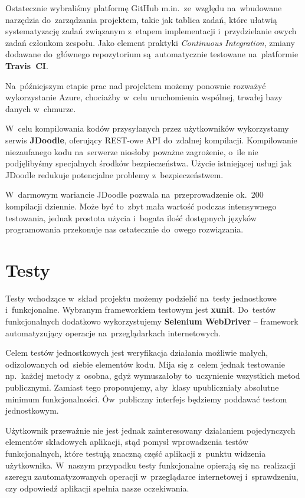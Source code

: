 \documentclass{article}
\begin{document}
Ostatecznie wybraliśmy platformę GitHub m.in.~ze~względu na~wbudowane narzędzia do~zarządzania projektem, takie jak tablica zadań, które ułatwią systematyzację zadań związanym z~etapem implementacji i~przydzielanie owych zadań członkom zespołu. Jako element praktyki \emph{Continuous Integration}, zmiany dodawane do~głównego repozytorium są~automatycznie testowane na~platformie \textbf{Travis~CI}.

Na~późniejszym etapie prac nad projektem możemy ponownie rozważyć wykorzystanie Azure, chociażby w~celu uruchomienia wspólnej, trwałej bazy danych w~chmurze.

W~celu kompilowania kodów przysyłanych przez użytkowników wykorzystamy serwis \textbf{JDoodle}, oferujący REST-owe API do~zdalnej kompilacji. Kompilowanie niezaufanego kodu na~serwerze niosłoby poważne zagrożenie, o~ile nie podjęlibyśmy specjalnych środków bezpieczeństwa. Użycie istniejącej usługi jak JDoodle redukuje potencjalne problemy z~bezpieczeństwem.

W~darmowym wariancie JDoodle pozwala na~przeprowadzenie ok.~200 kompilacji dziennie. Może być to~zbyt mała wartość podczas intensywnego testowania, jednak prostota użycia i~bogata ilość dostępnych języków programowania przekonuje nas ostatecznie do~owego rozwiązania.

\section{Testy}

Testy wchodzące w~skład projektu możemy podzielić na~testy jednostkowe i~funkcjonalne. Wybranym frameworkiem testowym jest \textbf{xunit}. Do~testów funkcjonalnych dodatkowo wykorzystujemy \textbf{Selenium WebDriver} -- framework automatyzujący operacje na~przeglądarkach internetowych.

Celem testów jednostkowych jest weryfikacja działania możliwie małych, odizolowanych od~siebie elementów kodu. Mija się z~celem jednak testowanie np.~każdej metody z~osobna, gdyż wymuszałoby to~uczynienie wszystkich metod publicznymi. Zamiast tego proponujemy, aby~klasy upubliczniały absolutne minimum funkcjonalności. Ów~publiczny interfejs będziemy poddawać testom jednostkowym.

Użytkownik przeważnie nie jest jednak zainteresowany działaniem pojedynczych elementów składowych aplikacji, stąd pomysł wprowadzenia testów funkcjonalnych, które testują znaczną część aplikacji z~punktu widzenia użytkownika. W~naszym przypadku testy funkcjonalne opierają się na~realizacji szeregu zautomatyzowanych operacji w~przeglądarce internetowej i~sprawdzeniu, czy odpowiedź aplikacji spełnia nasze oczekiwania.
\end{document}
